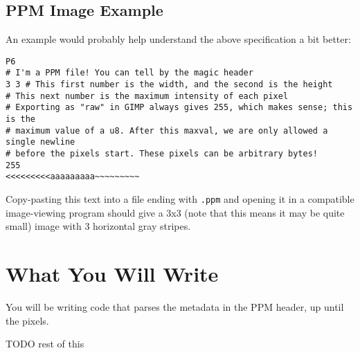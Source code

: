 \documentclass{article}
\begin{document}
\subsection*{PPM Image Example}
An example would probably help understand the above specification a bit better:
\begin{verbatim}
P6
# I'm a PPM file! You can tell by the magic header
3 3 # This first number is the width, and the second is the height
# This next number is the maximum intensity of each pixel
# Exporting as "raw" in GIMP always gives 255, which makes sense; this is the
# maximum value of a u8. After this maxval, we are only allowed a single newline
# before the pixels start. These pixels can be arbitrary bytes!
255
<<<<<<<<<aaaaaaaaa~~~~~~~~~
\end{verbatim}
Copy-pasting this text into a file ending with \texttt{.ppm} and opening it in a compatible image-viewing program should give a 3x3 (note that this means it may be quite small) image with 3 horizontal gray stripes.

\section*{What You Will Write}
You will be writing code that parses the metadata in the PPM header, up until the pixels.

TODO rest of this
\end{document}

